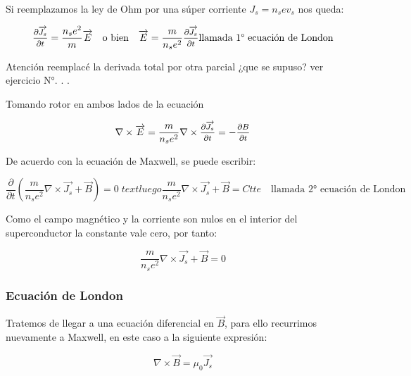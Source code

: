 Si reemplazamos la ley de Ohm por una súper corriente $J_{s}=n_{s}ev_{s}$ nos queda:

\begin{equation}
	\mfrac{\partial \overrightarrow{J_{s}}}{\partial t}=\frac{n_{s}e^{2}}{m}\overrightarrow{E} \quad \text{o bien} \quad \overrightarrow{E}= \frac{m}{n_{s}e^{2}} \mfrac{\partial \overrightarrow{J_{s}}}{\partial t} \text{llamada 1° ecuación de London}
\end{equation}

Atención reemplacé la derivada total por otra parcial ¿que se supuso? ver ejercicio N°. . .

Tomando rotor en ambos lados de la ecuación

\begin{equation}
	\nabla \times \overrightarrow{E} = \frac{m}{n_{s}e^{2}} \nabla \times \mfrac{\partial \overrightarrow{J_{s}}}{\partial t} = -\mfrac{\partial B}{\partial t}
\end{equation}

De acuerdo con la ecuación de Maxwell, se puede escribir:


\begin{equation}
	\frac{\partial}{\partial t}\left( \frac{m}{n_{s}e^{2}}\nabla \times \overrightarrow{J_{s}} + \overrightarrow{B}  \right) = 0 \; text{luego} \frac{m}{n_{s}e^{2}}\nabla \times \overrightarrow{J_{s}} + \overrightarrow{B} = Ctte \quad \text{llamada 2° ecuación de London}
\end{equation}

Como el campo magnético y la corriente son nulos en el interior del superconductor la constante vale cero, por tanto:

\begin{equation}
\label{eq:40}
\frac{m}{n_{s}e^{2}}\nabla \times \overrightarrow{J_{s}} + \overrightarrow{B} = 0
\end{equation}

\subsubsection{Ecuación de London}

Tratemos de llegar a una ecuación diferencial en $\overrightarrow{B}$, para ello recurrimos nuevamente a Maxwell, en este caso a la siguiente expresión:

\begin{equation*}
	\nabla \times \overrightarrow{B} = \mu_{0}\overrightarrow{J_{s}}
\end{equation*}

